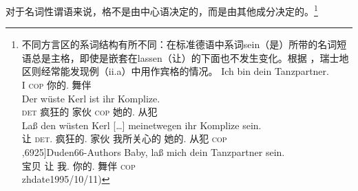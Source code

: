 对于名词性谓语\label{page-Kasuskongruenz}来说，格不是由中心语决定的，而是由其他成分决定的。\footnote{%
不同方言区的系词结构有所不同：在标准德语中系词sein（是）所带的名词短语总是主格，即使是嵌套在lassen（让）的下面也不发生变化。根据 \citet*[{\S}\,1259]{Duden95-Authors}，瑞士地区则经常能发现例（ii.a）中用作宾格的情况。
\eal
\ex 
\gll Ich bin dein Tanzpartner.\\
     I \textsc{cop} 你的.\nom{} 舞伴\\
\ex 
\gll Der wüste Kerl ist ihr Komplize.\\
     \textsc{det} 疯狂的  家伙  \textsc{cop}  她的.\nom{} 从犯\\
\ex 
\gll Laß den wüsten Kerl [\ldots] meinetwegen ihr Komplize sein.\\
     让 \textsc{det}.\acc{} 疯狂的.\acc{} 家伙 {} 我所关心的 她的.\nom{} 从犯 \textsc{cop}\\
\mytrans{我所关心的是，让我们来假定那个疯狂的家伙是她的从犯。' \citep*[{\S}},6925]{Duden66-Authors}%
\ex 
\gll Baby, laß mich dein Tanzpartner sein.\\
     宝贝 让 我.\acc{} 你的.\nom{} 舞伴 \textsc{cop}\\
zhdate{1995/10/11})
\zl

        \eal
        \zllast}
        
